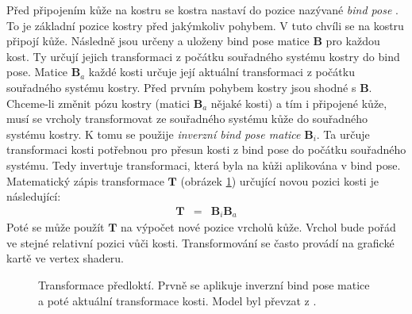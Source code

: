 Před připojením kůže na kostru se kostra nastaví do pozice nazývané \textit{bind pose} \cite{bindPose}. To je základní pozice kostry před jakýmkoliv pohybem. V tuto chvíli se na kostru připojí kůže. Následně jsou určeny a uloženy bind pose matice $\mathbf{B}$ pro každou kost. Ty určují jejich transformaci z počátku souřadného systému kostry do bind pose. Matice $\mathbf{B}_a$ každé kosti určuje její aktuální transformaci z počátku souřadného systému kostry. Před prvním pohybem kostry jsou shodné s $\mathbf{B}$. Chceme-li změnit pózu kostry (matici $\mathbf{B}_a$ nějaké kosti) a tím i připojené kůže, musí se vrcholy transformovat ze souřadného systému kůže do souřadného systému kostry. K tomu se použije \textit{inverzní bind pose matice} $\mathbf{B}_i$. Ta určuje transformaci kosti potřebnou pro přesun kosti z bind pose do počátku souřadného systému. Tedy invertuje transformaci, která byla na kůži aplikována v bind pose. Matematický zápis transformace $\mathbf{T}$ (obrázek \ref{transform_pose}) určující novou pozici kosti je následující:
\begin{eqnarray}
\mathbf{T} &=& \mathbf{B}_i \mathbf{B}_a\label{r.transform_mat}
\end{eqnarray}
Poté se může použít $\mathbf{T}$ na výpočet nové pozice vrcholů kůže. Vrchol bude pořád ve stejné relativní pozici vůči kosti. Transformování se často provádí na grafické kartě ve vertex shaderu.
 \begin{figure}[h]
\begin{center}
\caption{Transformace předloktí. Prvně se aplikuje inverzní bind pose matice a poté aktuální transformace kosti. Model byl převzat z \cite{venom}.} \label{transform_pose}
\end{center}
\end{figure}
